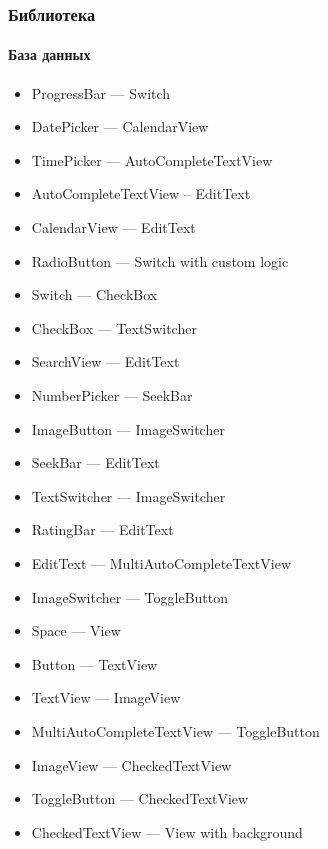 \documentclass{beamer}
\begin{document}
    \begin{frame}
        \frametitle{Библиотека}
        \framesubtitle{База данных}
        {\scriptsize \begin{multicols}{2}
            \begin{itemize}
                \item ProgressBar --- Switch
                \item DatePicker --- CalendarView
                \item TimePicker --- AutoCompleteTextView
                \item AutoCompleteTextView – EditText
                \item CalendarView --- EditText
                \item RadioButton --- Switch with custom logic
                \item Switch --- CheckBox
                \item CheckBox --- TextSwitcher
                \item SearchView --- EditText
                \item NumberPicker --- SeekBar
                \item ImageButton --- ImageSwitcher
                \item SeekBar --- EditText
                \item TextSwitcher --- ImageSwitcher
                \item RatingBar --- EditText
                \item EditText --- MultiAutoCompleteTextView
                \item ImageSwitcher --- ToggleButton
                \item Space --- View
                \item Button --- TextView
                \item TextView --- ImageView
                \item MultiAutoCompleteTextView --- ToggleButton
                \item ImageView --- CheckedTextView
                \item ToggleButton --- CheckedTextView
                \item CheckedTextView --- View with background
            \end{itemize}
        \end{multicols}}
    \end{frame}
\end{document}
